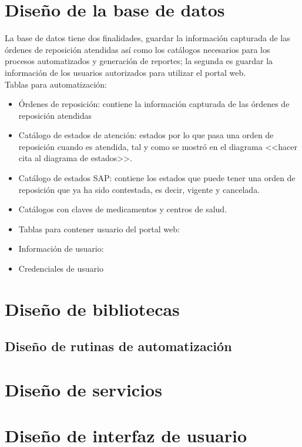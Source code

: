 \section{Diseño de la base de datos}
La base de datos tiene dos finalidades, guardar la información capturada de las órdenes de reposición atendidas así como los catálogos necesarios para los procesos automatizados y generación de reportes; la segunda es guardar la información de los usuarios autorizados para utilizar el portal web.\\
Tablas para automatización:
\begin{itemize}
	\item Órdenes de reposición: contiene la información capturada de las órdenes de reposición atendidas
	\item Catálogo de estados de atención: estados por lo que pasa una orden de reposición cuando es atendida, tal y como se mostró en el diagrama <<hacer cita al diagrama de estados>>.
	\item Catálogo de estados SAP: contiene los estados que puede tener una orden de reposición que ya ha sido contestada, es decir, vigente y cancelada.
	\item Catálogos con claves de medicamentos y centros de salud.
	\item Tablas para contener usuario del portal web:
	\item Información de usuario: 
	\item Credenciales de usuario
\end{itemize}



\section{Diseño de bibliotecas}

\subsection{Diseño de rutinas de automatización}




\section{Diseño de servicios}




\section{Diseño de interfaz de usuario}
